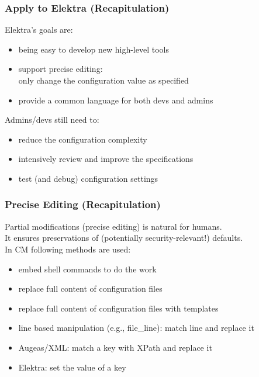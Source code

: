 \begin{frame}
	\frametitle{Apply to Elektra (Recapitulation)}

	Elektra's goals are:

	\begin{itemize}[<+-| alert@+>]
	\item being easy to develop new high-level tools
	\item support precise editing:\\ only change the configuration value as specified
	\item provide a common language for both devs and admins
	\end{itemize}

	\pause[\thebeamerpauses]  %

	Admins/devs still need to:

	\begin{itemize}[<+-| alert@+>]
	\item reduce the configuration complexity
	\item intensively review and improve the specifications
	\item test (and debug) configuration settings
	\end{itemize}
\end{frame}

\begin{frame}
	\frametitle{Precise Editing (Recapitulation)}

	Partial modifications (precise editing) is natural for humans. \\
	It ensures preservations of (potentially security-relevant!) defaults. \\
	In CM following methods are used:

	\begin{itemize}[<+-| alert@+>]
	\item embed shell commands to do the work
	\item replace full content of configuration files
	\item replace full content of configuration files with templates
	\item line based manipulation (e.g., file\_line): match line and replace it
	\item Augeas/XML: match a key with XPath and replace it
	\item Elektra: set the value of a key
	\end{itemize}
\end{frame}

